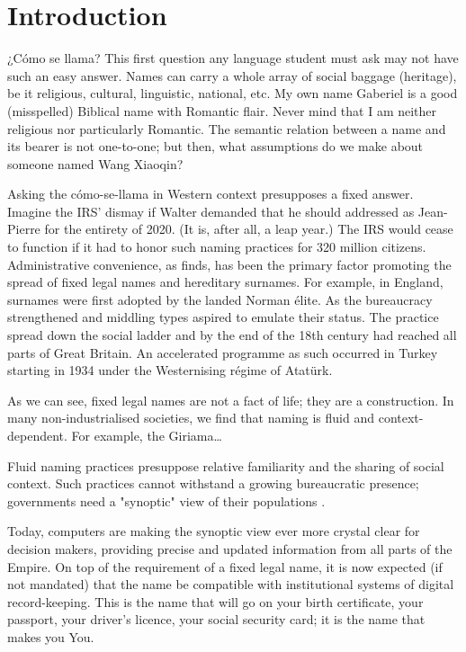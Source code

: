 \section{Introduction}

¿Cómo se llama? This first question any language student must ask may not have
such an easy answer. Names can carry a whole array of social baggage (heritage),
be it religious, cultural, linguistic, national, etc. My own name Gaberiel is a
good (misspelled) Biblical name with Romantic flair. Never mind that I am
neither religious nor particularly Romantic. The semantic relation between a
name and its bearer is not one-to-one; but then, what assumptions do we make
about someone named Wang Xiaoqin?

Asking the cómo-se-llama in Western context presupposes a fixed answer. Imagine
the IRS' dismay if Walter demanded that he should addressed as Jean-Pierre for
the entirety of 2020. (It is, after all, a leap year.) The IRS would cease to
function if it had to honor such naming practices for 320 million citizens.
Administrative convenience, as \textcite{scott02} finds, has been the primary
factor promoting the spread of fixed legal names and hereditary surnames. For
example, in England, surnames were first adopted by the landed Norman élite. As
the bureaucracy strengthened and middling types aspired to emulate their status.
The practice spread down the social ladder and by the end of the 18th century
had reached all parts of Great Britain. An accelerated programme as such
occurred in Turkey starting in 1934 under the Westernising régime of Atatürk.

As we can see, fixed legal names are not a fact of life; they are a
construction. In many non-industrialised societies, we find that naming is fluid
and context-dependent. For example, the Giriama…

Fluid naming practices presuppose relative familiarity and the sharing of social
context. Such practices cannot withstand a growing bureaucratic presence;
governments need a "synoptic" view of their populations \parencite{scott02}.

Today, computers are making the synoptic view ever more crystal clear for
decision makers, providing precise and updated information from all parts of the
Empire. On top of the requirement of a fixed legal name, it is now expected (if
not mandated) that the name be compatible with institutional systems of digital
record-keeping. This is the name that will go on your birth certificate, your
passport, your driver's licence, your social security card; it is the name that
makes you You.

